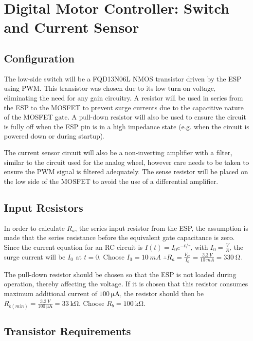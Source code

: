 \graphicspath{{content/2_design/figures/}}
\section{Digital Motor Controller: Switch and Current Sensor}

\subsection{Configuration}

The low-side switch will be a FQD13N06L NMOS transistor driven by the ESP using PWM. This transistor was chosen due to its
low turn-on voltage, eliminating the need for any gain circuitry. A resistor will be used in series from the ESP to the MOSFET to
prevent surge currents due to the capacitive nature of the MOSFET gate. A pull-down resistor will also be used to ensure
the circuit is fully off when the ESP pin is in a high impedance state (e.g. when the circuit is powered down or during startup).

The current sensor circuit will also be a non-inverting amplifier with a filter, similar to the circuit used for the analog wheel,
however care needs to be taken to ensure the PWM signal is filtered adequately. The sense resistor will be placed on the low side
of the MOSFET to avoid the use of a differential amplifier.

\subsection{Input Resistors}

In order to calculate $R_a$, the series input resistor from the ESP, the assumption is made that the series resistance before the equivalent gate capacitance is zero.
Since the current equation for an RC circuit is $I(t) = I_0 e^{-t/\tau}$, with $I_0 = \frac{V}{R}$, the surge current will be $I_0$ at $t = 0$. Choose $I_0 = \SI{10}{mA}$
$\therefore R_a = \frac{V_{cc}}{I_0} = \frac{\SI{3.3}{V}}{\SI{10}{mA}} = \SI{330}{\ohm}$.

The pull-down resistor should be chosen so that the ESP is not loaded during operation, thereby affecting the voltage. If it is chosen that this resistor consumes
maximum additional current of $\SI{100}{\micro\ampere}$, the resistor should then be $R_{b(min)} = \frac{\SI{3.3}{V}}{\SI{100}{\micro\ampere}} = \SI{33}{\kilo\ohm}$.
Choose $R_b = \SI{100}{\kilo\ohm}$.

\subsection{Transistor Requirements}

